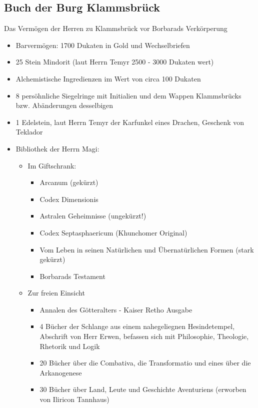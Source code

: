 \subsection{Buch der Burg Klammsbrück}

Das Vermögen der Herren zu Klammsbrück vor Borbarads Verkörperung
\begin{itemize}
    \item Barvermögen: 1700 Dukaten in Gold und Wechselbriefen
    \item 25 Stein Mindorit (laut Herrn Temyr 2500 - 3000 Dukaten wert)
    \item Alchemistische Ingredienzen im Wert von circa 100 Dukaten
    \item 8 persöhnliche Siegelringe mit Initialien und dem Wappen Klammsbrücks bzw. Abänderungen desselbigen
    \item 1 Edelstein, laut Herrn Temyr der Karfunkel eines Drachen, Geschenk von Teklador
    \item Bibliothek der Herrn Magi:
    \begin{itemize}
        \item Im Giftschrank:
        \begin{itemize}
            \item Arcanum (gekürzt)
            \item Codex Dimensionis 
            \item Astralen Geheimnisse (ungekürzt!)
            \item Codex Septasphaericum (Khunchomer Original)
            \item Vom Leben in seinen Natürlichen und Übernatürlichen Formen (stark gekürzt)
            \item Borbarads Testament
        \end{itemize}
        \item Zur freien Einsicht
        \begin{itemize}
            \item Annalen des Götteralters - Kaiser Retho Ausgabe
            \item 4 Bücher der Schlange aus einem nahegeliegnen Hesindetempel, Abschrift von Herr Erwen, befassen sich mit Philosophie, Theologie, Rhetorik und Logik
            \item 20 Bücher über die Combativa, die Transformatio und eines über die  Arkanogenese
            \item 30 Bücher über Land, Leute und Geschichte Aventuriens (erworben von Iliricon Tannhaus)
        \end{itemize}

\end{itemize}
\end{itemize}
